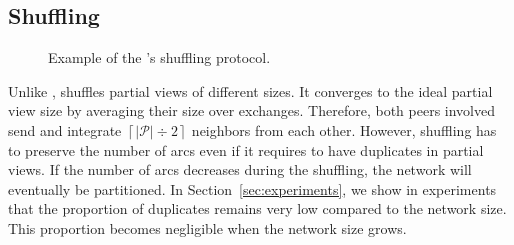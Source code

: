 
\subsection{Shuffling}
\label{subsec:cyclic}

\begin{figure*}
  \centering
  \hspace{10pt}
  \hspace{10pt}
  \caption{\label{fig:cyclicexample}Example of the \SPRAY's shuffling
    protocol. }
\end{figure*}





Unlike \CYCLON, \SPRAY shuffles partial views of different sizes. It
converges to the ideal partial view size by averaging their size over
exchanges. Therefore, both peers involved send and integrate
$\left\lceil|\mathcal{P}| \div 2 \right\rceil$ neighbors from each
other. However, shuffling has to preserve the number of arcs even if it
requires to have duplicates in partial views. If the number of arcs decreases
during the shuffling, the network will eventually be partitioned. In
Section~\ref{sec:experiments}, we show in experiments that the proportion of
duplicates remains very low compared to the network size. This proportion
becomes negligible when the network size grows. 


